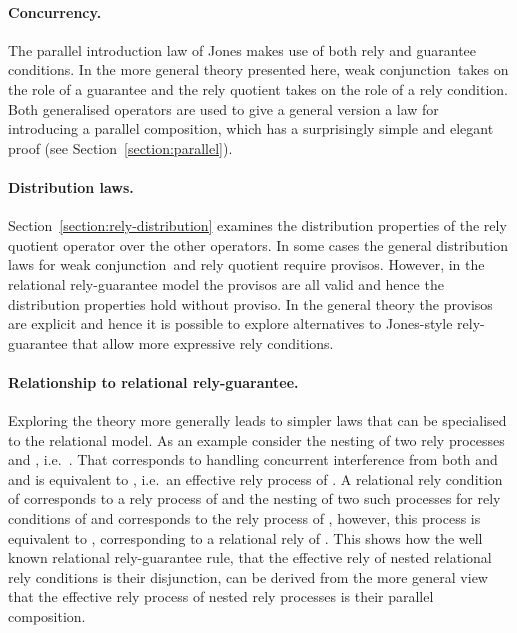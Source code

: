 \documentclass[fleqn]{fac}
\newcommand{\strictconjunction}{weak conjunction}
\begin{document}
\paragraph{Concurrency.}

The parallel introduction law of Jones makes use of both rely and guarantee conditions.
In the more general theory presented here, 
\strictconjunction\ takes on the role of a guarantee 
and the rely quotient takes on the role of a rely condition.
Both generalised operators are used 
to give a general version a law for introducing a parallel composition,
which has a surprisingly simple and elegant proof (see Section~\ref{section:parallel}).

\paragraph{Distribution laws.}

Section~\ref{section:rely-distribution} examines the distribution properties of 
the rely quotient operator over the other operators.
In some cases the general distribution laws for \strictconjunction\ and rely quotient
require provisos.
However, in the relational rely-guarantee model
the provisos are all valid and hence the distribution properties hold without proviso.
In the general theory the provisos are explicit and 
hence it is possible to explore alternatives to Jones-style rely-guarantee
that allow more expressive rely conditions.

\paragraph{Relationship to relational rely-guarantee.}

Exploring the theory more generally 
leads to simpler laws 
that can be specialised to the relational model.
As an example consider the nesting of two rely processes  and , i.e.\ . 
That corresponds to handling concurrent interference from both  and 
and is equivalent to ,
i.e.\ an effective rely process of .
A relational rely condition of  corresponds to a rely process of 
and the nesting of two such processes for rely conditions of  and 
corresponds to the rely process of 
,
however, 
this process is equivalent to ,
corresponding to a relational rely of .
This shows how the well known relational rely-guarantee rule, 
that the effective rely of nested relational rely conditions is their disjunction,
can be derived from the more general view that the effective rely process 
of nested rely processes is their parallel composition.
\end{document}
